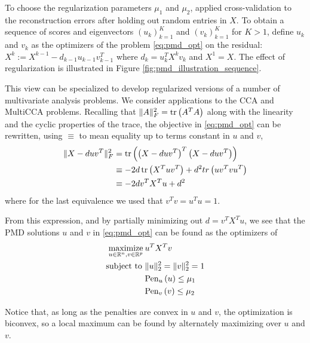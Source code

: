 \documentclass{article}
\begin{document}
To choose the regularization parameters $\mu_{1}$ and $\mu_{2}$,
\citep{witten2009penalized} applied cross-validation to the reconstruction
errors after holding out random entries in $X$. To obtain a sequence of scores
and eigenvectors $\left(u_{k}\right)_{k = 1}^{K}$ and $\left(v_{k}\right)_{k =
  1}^{K}$ for $K > 1$, define $u_{k}$ and $v_{k}$ as the optimizers of the
problem \ref{eq:pmd_opt} on the residual: $X^{k} := X^{k - 1} - d_{k - 1}u_{k -
  1}v_{k - 1}^{T}$ where $d_{k} = u_{k}^{T} X^{k}v_{k}$ and $X^{1} = X$.
The effect of regularization is illustrated in Figure
\ref{fig:pmd_illustration_sequence}.


This view can be specialized to develop regularized versions of a number of
multivariate analysis problems. We consider applications to the CCA and MultiCCA
problems. Recalling that $\|A\|_{F}^{2} = \mathop\mathrm{tr}\left(A^{T}A\right)$ along with the
linearity and the cyclic properties of the trace, the objective in
\ref{eq:pmd_opt} can be rewritten, using $\equiv$ to mean equality up to terms
constant in $u$ and $v$,
\begin{align*}
  \|X - duv^{T}\|_{F}^{2} &= \mathop\mathrm{tr}\left(\left(X -
      duv^{T}\right)^{T}\left(X - duv^{T}\right)\right) \\
  &\equiv -2d\mathop\mathrm{tr}\left(X^{T}uv^{T}\right) + d^{2}tr\left(uv^{T}vu^{T}\right) \\
  &\equiv -2d v^{T}X^{T}u + d^{2}
\end{align*}
where for the last equivalence we used that $v^{T}v = u^{T}u = 1$.

From this expression, and by partially minimizing out $d = v^{T}X^{T}u$, we see
that the PMD solutions $u$ and $v$ in \ref{eq:pmd_opt} can be found as the
optimizers of
\begin{align}
\label{eq:pmd_reform}  \mathop\mathrm{maximize}_{u \in \mathbb{R}^{n}, v \in \mathbb{R}^{p}} \medspace &u^{T}X^{T}v \\
  \text{subject to } &\|u\|_{2}^{2} = \|v\|_{2}^{2} = 1 \nonumber \\
  &\text{Pen}_{u}\left(u\right) \leq \mu_{1}\nonumber \\
  &\text{Pen}_{v}\left(v\right) \leq \mu_{2} \nonumber
\end{align}

Notice that, as long as the penalties are convex in $u$ and $v$, the
optimization is biconvex, so a local maximum can be found by
alternately maximizing over $u$ and $v$.
\end{document}
